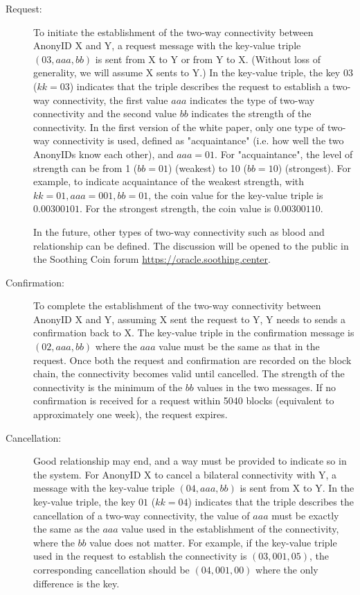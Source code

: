 \documentclass[12pt, a4paper]{article}
\begin{document}
\begin{description}

\item[Request:] To initiate the establishment of the two-way connectivity between AnonyID X and Y, a request message with the key-value triple $(03, aaa, bb)$ is sent from X to Y or from Y to X. (Without loss of generality, we will assume X sents to Y.) In the key-value triple, the key $03$ ($kk = 03$) indicates that the triple describes the request to establish a two-way connectivity, the first value $aaa$ indicates the type of two-way connectivity and the second value $bb$ indicates the strength of the connectivity. In the first version of the white paper, only one type of two-way connectivity is used, defined as "acquaintance" (i.e. how well the two AnonyIDs know each other), and $aaa = 01$. For "acquaintance", the level of strength can be from 1 ($bb = 01$) (weakest) to 10 ($bb = 10$) (strongest). For example, to indicate acquaintance of the weakest strength, with $kk = 01, aaa = 001,bb = 01$, the coin value for the key-value triple is $0.00300101$. For the strongest strength, the coin value is $0.00300110$.

In the future, other types of two-way connectivity such as blood and relationship can be defined. The discussion will be opened to the public in the Soothing Coin forum \href{https://oracle.soothing.center}{https://oracle.soothing.center}.

\item[Confirmation:] To complete the establishment of the two-way connectivity between AnonyID X and Y, assuming X sent the request to Y, Y needs to sends a confirmation back to X. The key-value triple in the confirmation message is $(02, aaa, bb)$ where the $aaa$ value must be the same as that in the request. Once both the request and confirmation are recorded on the block chain, the connectivity becomes valid until cancelled. The strength of the connectivity is the minimum of the $bb$ values in the two messages. If no confirmation is received for a request within 5040 blocks (equivalent to approximately one week), the request expires.

\item[Cancellation:] Good relationship may end, and a way must be provided to indicate so in the system. For AnonyID X to cancel a bilateral connectivity with Y, a message with the key-value triple $(04, aaa, bb)$ is sent from X to Y. In the key-value triple, the key $01$ ($kk = 04$) indicates that the triple describes the cancellation of a two-way connectivity, the value of $aaa$ must be exactly the same as the $aaa$ value used in the establishment of the connectivity, where the $bb$ value does not matter. For example, if the key-value triple used in the request to establish the connectivity is $(03, 001, 05)$, the corresponding cancellation should be $(04, 001, 00)$ where the only difference is the key.


\end{description}
\end{document}

